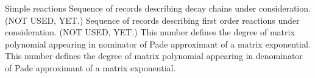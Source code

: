 \begin{recordtype}{Simple reactions}{}
Sequence of records describing decay chains under consideration. (NOT USED, YET.)
Sequence of records describing first order reactions under consideration. (NOT USED, YET.)
This number defines the degree of matrix polynomial appearing in nominator of Pade approximant of a matrix exponential.
This number defines the degree of matrix polynomial appearing in denominator of Pade approximant of a matrix exponential.
\end{recordtype}

